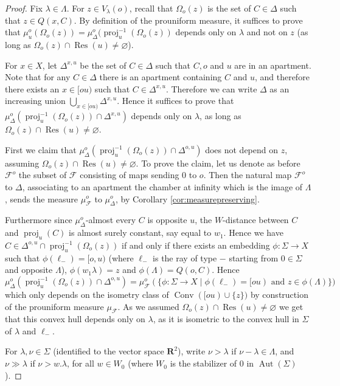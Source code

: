 \documentclass[a4paper, 11pt]{article}
\theoremstyle{plain}
\theoremstyle{definition}
\theoremstyle{remark}
\DeclareMathOperator{\Conv}{Conv}
\DeclareMathOperator{\Aut}{Aut}
\DeclareMathOperator{\proj}{proj}
\DeclareMathOperator{\Res}{Res}
\newcommand{\RR}{\mathbf{R}}                          %
\newcommand{\scrF}{\mathscr F}
\begin{document}
\begin{proof}
Fix $\lambda\in \Lambda$.
For $z\in V_\lambda(o)$, recall that $\Omega_o(z)$ is the set of $C\in\Delta$ such that $z\in Q(x,C)$. By definition of the prouniform measure, it suffices to prove that $\mu_u^o(\Omega_o(z))=\mu_\Delta^o(\proj_u^{-1}(\Omega_o(z))$ depends only on $\lambda$ and not on $z$ (as long as $\Omega_o(z)\cap \Res(u)\neq \varnothing$).

For $x\in X$, let $\Delta^{x,u}$ be the set of $C\in \Delta$ such that $C,o$ and $u$ are in an apartment. Note that for any $C\in \Delta$ there is an apartment containing $C$ and $u$, and therefore there exists an $x\in [ou)$ such that $C\in \Delta^{x,u}$. Therefore we can write $\Delta$ as an increasing union $\bigcup_{x\in [ou)} \Delta^{x,u}$. Hence it suffices to prove that  $\mu_\Delta^o(\proj_u^{-1}(\Omega_o(z))\cap \Delta^{x,u})$ depends only on $\lambda$, as long as $\Omega_o(z)\cap \Res(u)\neq\varnothing$.

 First we claim that $\mu_\Delta^o(\proj_u^{-1}(\Omega_o(z))\cap \Delta^{o,u})$ does not depend on $z$, assuming $\Omega_o(z)\cap \Res(u)\neq \varnothing$. To prove the claim, let us denote as before $\scrF^o$ the subset of $\scrF$ consisting of maps sending $0$ to $o$. Then the natural map $\scrF^o$ to $\Delta$, associating to an apartment the chamber at infinity which is the image of $\Lambda$, sends the measure $\mu_\scrF^o$ to $\mu_\Delta^o$, by Corollary \ref{cor:measurepreserving}.

Furthermore since $\mu_\Delta^o$-almost every $C$ is opposite $u$, the $W$-distance between $C$ and $\proj_u(C)$ is almost surely constant, say equal to $w_1$. Hence we have $C\in \Delta^{o,u} \cap \proj_u^{-1}(\Omega_o(z))$ if and only if there exists an embedding $\phi:\Sigma\to X$ such that $\phi(\ell_-)=[o,u)$ (where $\ell_-$ is the ray of type $-$ starting from $0\in\Sigma$ and opposite  $\Lambda$), $\phi(w_1\lambda)=z$ and $\phi(\Lambda)=Q(o,C)$.
Hence $$\mu_\Delta^o(\proj_u^{-1}(\Omega_o(z))\cap \Delta^{o,u})
 = \mu_\scrF^o(\{\phi:\Sigma \to X \mid  \phi(\ell_-)=[ou) \textrm{ and } z\in \phi(\Lambda) \})$$ which only depends on the isometry class of $\Conv([ou)\cup\{z\})$ by construction of the prouniform measure $\mu_\scrF$. As we assumed $\Omega_o(z)\cap \Res(u)\neq \varnothing$ we get that this convex hull depends only on $\lambda$, as it is isometric to the convex hull in $\Sigma$ of $\lambda$ and $\ell_-$.


For $\lambda,\nu\in \Sigma$ (identified to the vector space $\RR^2$), write $\nu>\lambda$ if $\nu-\lambda\in \Lambda$, and $\nu\gg \lambda$ if $\nu>w.\lambda$, for all $w\in W_0$ (where $W_0$ is the stabilizer of $0$ in $\Aut(\Sigma)$).


\end{proof}
\end{document}
